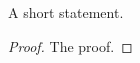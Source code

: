 \begin{theorem} \label{thm:sharp}
A short statement.
\end{theorem}

\begin{proof}\label{prf:sharp}
The proof.
\end{proof}
